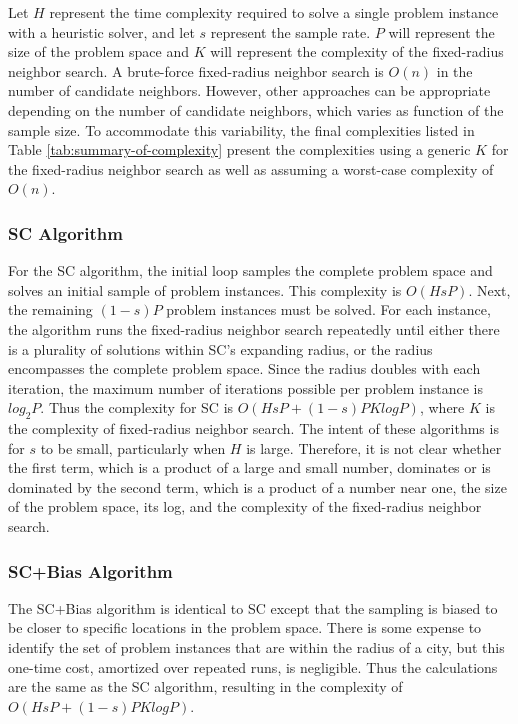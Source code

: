 Let $H$ represent the time complexity required to solve a single problem instance with a heuristic solver, and let $s$ represent the sample rate.  $P$ will represent the size of the problem space and $K$ will represent the complexity of the fixed-radius neighbor search.  A brute-force fixed-radius neighbor search is $O(n)$ in the number of candidate neighbors.  However, other approaches can be appropriate depending on the number of candidate neighbors, which varies as function of the sample size.  To accommodate this variability, the final complexities listed in Table \ref{tab:summary-of-complexity} present the complexities using a generic $K$ for the fixed-radius neighbor search as well as assuming a worst-case complexity of  $O(n)$.

\subsubsection{SC Algorithm}For the SC algorithm, the initial loop samples the complete problem space and solves an initial sample of problem instances.  This complexity is $O(HsP)$.  Next, the remaining $(1-s)P$ problem instances must be solved.  For each instance, the algorithm runs the fixed-radius neighbor search repeatedly until either there is a plurality of solutions within SC's expanding radius, or the radius encompasses the complete problem space.  Since the radius doubles with each iteration, the maximum number of iterations possible per problem instance is $log_2P$.  Thus the complexity for SC is $O(HsP + (1-s)PKlogP)$, where $K$ is the complexity of fixed-radius neighbor search.  The intent of these algorithms is for $s$ to be small, particularly when $H$ is large.  Therefore, it is not clear whether the first term, which is a product of a large and small number, dominates or is dominated by the second term, which is a product of a number near one, the size of the problem space, its log, and the complexity of the fixed-radius neighbor search.

\subsubsection{SC+Bias Algorithm} The SC+Bias algorithm is identical to SC except that the sampling is biased to be closer to specific locations in the problem space. There is some expense to identify the set of problem instances that are within the radius of a city, but this one-time cost, amortized over repeated runs, is negligible.  Thus the calculations are the same as the SC algorithm, resulting in the complexity of $O(HsP + (1-s)PKlogP)$.


